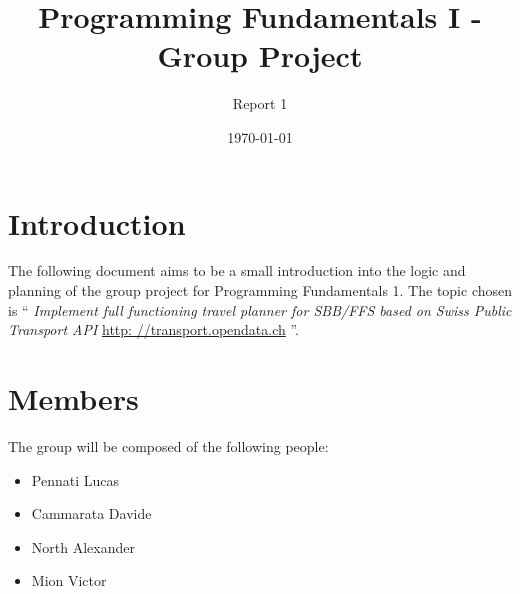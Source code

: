 \documentclass[a4paper]{article}
\title{Programming Fundamentals I - Group Project}
\author{Report 1}
\date{\today}
\begin{document}
\maketitle
\section{Introduction}
The following document aims to be a small introduction into the logic and planning of the group project for Programming Fundamentals 1. The topic chosen is ``\emph{
Implement full functioning travel planner for SBB/FFS based on Swiss Public Transport API} \url{http: //transport.opendata.ch}
''.
\section{Members}
The group will be composed of the following people:
\begin{itemize}
\item Pennati Lucas
\item Cammarata Davide
\item North Alexander
\item Mion Victor
\end{itemize}
\end{document}
